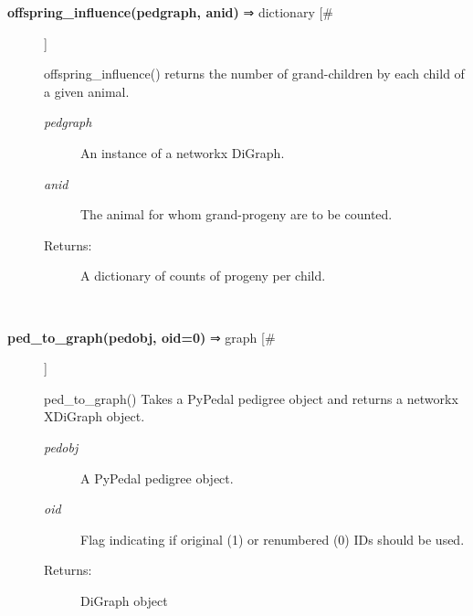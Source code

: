 \documentclass[10pt]{article}
\begin{document}
\begin{description}
\item[\textbf{offspring\_influence(pedgraph, anid)}
 ⇒ dictionary [\#]]

 offspring\_influence() returns the number of grand-children by each child of a given animal.
\begin{description}
\item[\emph{pedgraph}
] An instance of a networkx DiGraph.
\item[\emph{anid}
] The animal for whom grand-progeny are to be counted.
\item[Returns:] A dictionary of counts of progeny per child.

\end{description}
\\ 

\item[\textbf{ped\_to\_graph(pedobj, oid=0)}
 ⇒ graph [\#]]

 ped\_to\_graph() Takes a PyPedal pedigree object and returns a networkx XDiGraph object.
\begin{description}
\item[\emph{pedobj}
] A PyPedal pedigree object.
\item[\emph{oid}
] Flag indicating if original (1) or renumbered (0) IDs should be used.
\item[Returns:] DiGraph object

\end{description}
\\ 


\end{description}
\end{document}
